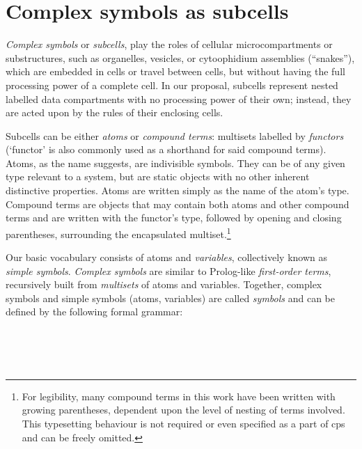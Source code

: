 \section{Complex symbols as subcells}

\emph{Complex symbols} or \emph{subcells}, 
play the roles of cellular microcompartments or substructures,
such as organelles, vesicles, or cytoophidium assemblies (``snakes''),
which are embedded in cells or travel between cells, 
but without having the full processing power of a complete cell.
In our proposal, subcells represent nested labelled data compartments
with no processing power of their own;
instead, they are acted upon by the rules of their enclosing cells.

Subcells can be either \emph{atoms} or \emph{compound terms}: multisets labelled by \emph{functors} (`functor' is also commonly used as a shorthand for said compound terms).  Atoms, as the name suggests, are indivisible symbols.  They can be of any given type relevant to a system, but are static objects with no other inherent distinctive properties.  Atoms are written simply as the name of the atom's type.  Compound terms are objects that may contain both atoms and other compound terms and are written with the functor's type, followed by opening and closing parentheses, surrounding the encapsulated multiset.\footnote{For legibility, many compound terms in this work have been written with growing parentheses, dependent upon the level of nesting of terms involved.  This typesetting behaviour is not required or even specified as a part of \gls{cps} and can be freely omitted.}

Our basic vocabulary consists of atoms and \emph{variables}, collectively known as \emph{simple symbols}.  \emph{Complex symbols} are similar to Prolog-like \emph{first-order terms}, recursively built from \emph{multisets} of atoms and variables.  Together, complex symbols and simple symbols (atoms, variables) are called \emph{symbols} and can be defined by the following formal grammar:

\begin{framed}
\vspace{-0.6cm}
\begin{small}
\begin{bnf*}
    \\
    \\
    \\
\end{bnf*}
\end{small}
\vspace{-0.8cm}
\end{framed}

